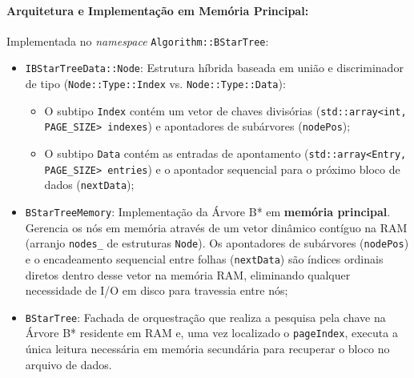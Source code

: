 \documentclass[12pt,a4paper]{article}
\begin{document}
\paragraph{Arquitetura e Implementação em Memória Principal:}
Implementada no \textit{namespace} \texttt{Algorithm::BStarTree}:
\begin{itemize}
    \item \texttt{IBStarTreeData::Node}: Estrutura híbrida baseada em união e discriminador de tipo (\texttt{Node::Type::Index} vs. \texttt{Node::Type::Data}):
    \begin{itemize}
        \item O subtipo \texttt{Index} contém um vetor de chaves divisórias (\texttt{std::array<int, PAGE\_SIZE> indexes}) e apontadores de subárvores (\texttt{nodePos});
        \item O subtipo \texttt{Data} contém as entradas de apontamento (\texttt{std::array<}\allowbreak\texttt{Entry, PAGE\_SIZE> entries}) e o apontador sequencial para o próximo bloco de dados (\texttt{nextData});
    \end{itemize}
    \item \texttt{BStarTreeMemory}: Implementação da Árvore B* em \textbf{memória principal}. Gerencia os nós em memória através de um vetor dinâmico contíguo na RAM (arranjo \texttt{nodes\_} de estruturas \texttt{Node}). Os apontadores de subárvores (\texttt{nodePos}) e o encadeamento sequencial entre folhas (\texttt{nextData}) são índices ordinais diretos dentro desse vetor na memória RAM, eliminando qualquer necessidade de I/O em disco para travessia entre nós;
    \item \texttt{BStarTree}: Fachada de orquestração que realiza a pesquisa pela chave na Árvore B* residente em RAM e, uma vez localizado o \texttt{pageIndex}, executa a única leitura necessária em memória secundária para recuperar o bloco no arquivo de dados.
\end{itemize}
\end{document}
